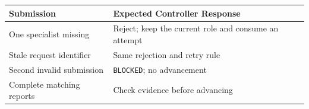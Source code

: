 \begin{tabular}{@{}P{4.0cm}P{8.5cm}@{}}
\toprule
\textbf{Submission} & \textbf{Expected Controller Response} \\
\midrule
One specialist missing & Reject; keep the current role and consume an attempt \\
Stale request identifier & Same rejection and retry rule \\
Second invalid submission & \texttt{BLOCKED}; no advancement \\
Complete matching reports & Check evidence before advancing \\
\bottomrule
\end{tabular}
